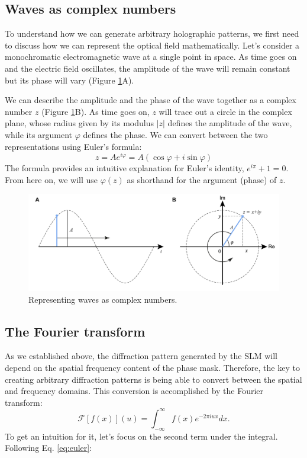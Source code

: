 \documentclass[a4paper]{report}
\begin{document}
\subsection{Waves as complex numbers}
To understand how we can generate arbitrary holographic patterns, we first need to discuss how we can represent the optical field mathematically. Let's consider a monochromatic electromagnetic wave at a single point in space. As time goes on and the electric field oscillates, the amplitude of the wave will remain constant but its phase will vary (Figure \ref{fig:complex}A).

We can describe the amplitude and the phase of the wave together as a complex number $z$ (Figure \ref{fig:complex}B). As time goes on, $z$ will trace out a circle in the complex plane, whose radius given by its modulus $|z|$ defines the amplitude of the wave, while its argument $\varphi$ defines the phase. We can convert between the two representations using Euler's formula:
\begin{equation}
	z = A e^{i\varphi} = A (\cos \varphi + i \sin \varphi)
	\label{eq:euler}
\end{equation}
The formula provides an intuitive explanation for Euler's identity, $e^{i\pi} + 1 = 0$. From here on, we will use $\varphi(z)$ as shorthand for the argument (phase) of $z$.

\begin{figure}[b]
\centering
\includegraphics[width=.8\textwidth]{complex.pdf}
\caption{Representing waves as complex numbers.}
\label{fig:complex}	
\end{figure}

\subsection{The Fourier transform}
As we established above, the diffraction pattern generated by the SLM will depend on the spatial frequency content of the phase mask. Therefore, the key to creating arbitrary diffraction patterns is being able to convert between the spatial and frequency domains. This conversion is accomplished by the Fourier transform:
\begin{equation}
	\mathscr{F}[f(x)] ( u ) = \int _ { - \infty } ^ { \infty } f ( x  ) e ^ { - 2 \pi i u x } d x. 
	\label{eq:fourier}
\end{equation}
To get an intuition for it, let's focus on the second term under the integral. Following Eq. \ref{eq:euler}:
\end{document}
